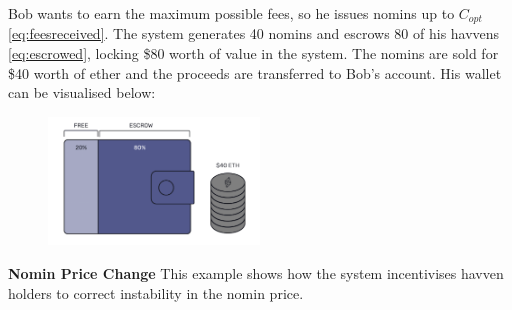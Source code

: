 \noindent Bob wants to earn the maximum possible fees, so he issues nomins up to $C_{opt}$ \eqref{eq:feesreceived}. The system generates 40 nomins and escrows 80 of his havvens \eqref{eq:escrowed}, locking \$80 worth of value in the system. The nomins are sold for \$40 worth of ether and the proceeds are transferred to Bob's account. His wallet can be visualised below:
\begin{figure}[h!]
\centering
    \includegraphics[width=0.5\textwidth]{img/escrowed_wallet_new}
\end{figure}

\noindent \textbf{Nomin Price Change} This example shows how the system incentivises havven holders to correct instability in the nomin price.

